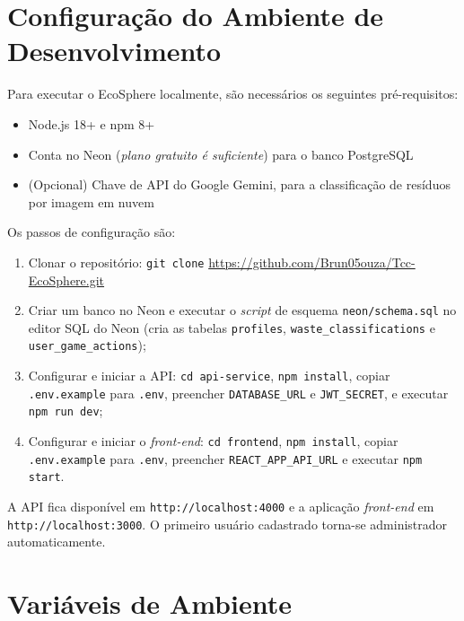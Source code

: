 \documentclass[
	12pt,
	openright,
	oneside,
	a4paper,
	chapter=TITLE,
	section=TITLE,
	subsection=TITLE,
	subsubsection=TITLE,
	english,
	brazil
	]{abntex2}
\begin{document}
\begin{apendicesenv}
\partapendices

\chapter{Configuração do Ambiente de Desenvolvimento}

Para executar o EcoSphere localmente, são necessários os seguintes pré-requisitos:

\begin{itemize}
    \item Node.js 18+ e npm 8+
    \item Conta no Neon (\textit{plano gratuito é suficiente}) para o banco PostgreSQL
    \item (Opcional) Chave de API do Google Gemini, para a classificação de resíduos por imagem em nuvem
\end{itemize}

Os passos de configuração são:

\begin{enumerate}
    \item Clonar o repositório: \texttt{git clone} \url{https://github.com/Brun05ouza/Tcc-EcoSphere.git}
    \item Criar um banco no Neon e executar o \textit{script} de esquema \texttt{neon/schema.sql} no editor SQL do Neon (cria as tabelas \texttt{profiles}, \texttt{waste\_classifications} e \texttt{user\_game\_actions});
    \item Configurar e iniciar a API: \texttt{cd api-service}, \texttt{npm install}, copiar \texttt{.env.example} para \texttt{.env}, preencher \texttt{DATABASE\_URL} e \texttt{JWT\_SECRET}, e executar \texttt{npm run dev};
    \item Configurar e iniciar o \textit{front-end}: \texttt{cd frontend}, \texttt{npm install}, copiar \texttt{.env.example} para \texttt{.env}, preencher \texttt{REACT\_APP\_API\_URL} e executar \texttt{npm start}.
\end{enumerate}

A API fica disponível em \texttt{http://localhost:4000} e a aplicação \textit{front-end} em \texttt{http://localhost:3000}. O primeiro usuário cadastrado torna-se administrador automaticamente.

\chapter{Variáveis de Ambiente}


\end{apendicesenv}
\end{document}
